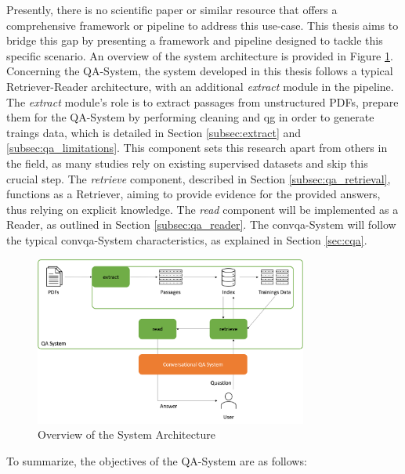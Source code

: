 Presently, there is no scientific paper or similar resource that offers a comprehensive framework or pipeline to address this use-case. This thesis aims to bridge this gap by presenting a framework and pipeline designed to tackle this specific scenario. An overview of the system architecture is provided in Figure \ref{fig:overview-system-architecture}. Concerning the QA-System, the system developed in this thesis follows a typical Retriever-Reader architecture, with an additional \textit{extract} module in the pipeline. The \textit{extract} module's role is to extract passages from unstructured PDFs, prepare them for the QA-System by performing cleaning and \gls{qg} in order to generate traings data, which is detailed in Section \ref{subsec:extract} and \ref{subsec:qa_limitations}. This component sets this research apart from others in the field, as many studies rely on existing supervised datasets and skip this crucial step. The \textit{retrieve} component, described in Section \ref{subsec:qa_retrieval}, functions as a Retriever, aiming to provide evidence for the provided answers, thus relying on explicit knowledge. The \textit{read} component will be implemented as a Reader, as outlined in Section \ref{subsec:qa_reader}. The \gls{convqa}-System will follow the typical \gls{convqa}-System characteristics, as explained in Section \ref{sec:cqa}.

\begin{figure}
    \centering
    \includegraphics[width=0.8\textwidth]{Grafiken/System_Architecture.png}
    \caption{Overview of the System Architecture}
    \label{fig:overview-system-architecture}
\end{figure}

To summarize, the objectives of the QA-System are as follows:

